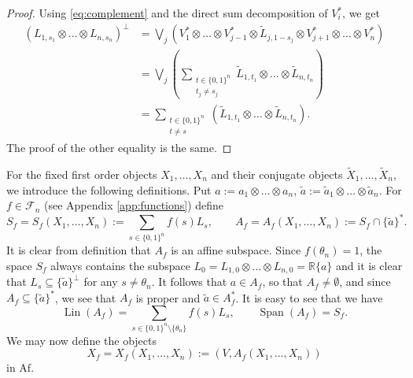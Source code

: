 \documentclass[12pt]{article}
\theoremstyle{definition}
\theoremstyle{remark}
\def\lin{\operatorname{Lin}}
\def\Span{\operatorname{Span}}
\def\Fe{\mathcal F}
\def \Af{\mathrm{Af}}
\begin{document}
\begin{proof} Using \eqref{eq:complement} and the direct sum decomposition of $V_i^*$, we get
\begin{align*}
\left(L_{1,s_{1}}\otimes \dots\otimes L_{n,s_{n}}\right)^\perp&= \bigvee_j\left(
V_{1}^*\otimes
\dots \otimes V_{j-1}^*\otimes \tilde L_{j,1-s_{j}}\otimes V_{j+1}^*\otimes\dots \otimes
V_{n}^*\right)\\
&= \bigvee_j \left( \sum_{\substack{t\in \{0,1\}^n\\ t_{j}\ne s_{j}}} \tilde
L_{1,t_{1}}\otimes\dots \otimes \tilde
L_{n,t_{n}}\right)\\
&= \sum_{\substack{t\in \{0,1\}^n\\ t\ne s}} \left( \tilde L_{1,t_{1}}\otimes\dots \otimes \tilde
L_{n,t_{n}}\right).
\end{align*}
The proof of the other equality is the same.

\end{proof}

For the fixed first order objects  $X_1,\dots,X_n$ and their conjugate objects $\tilde
X_1,\dots,\tilde X_n$, we introduce the following definitions. Put $a:= a_1\otimes\dots \otimes  a_n$, $\tilde a:= \tilde
a_1\otimes\dots\otimes  \tilde a_n$.
For  $f\in \Fe_n$ (see Appendix \ref{app:functions}) define 
\begin{equation}\label{eq:SfAf}
S_f=S_f(X_1,\dots,X_n):=\sum_{s\in \{0,1\}^n} f(s)L_s,\qquad
A_f=A_f(X_1,\dots,X_n):=S_f\cap \{\tilde a\}^*.
\end{equation}
It is clear from definition that $A_f$ is an affine subspace. Since
$f(\theta_n)=1$, the space $S_f$ always contains the subspace $L_0=L_{1,0}\otimes\dots\otimes
L_{n,0}=\mathbb R\{a\}$ and it is clear that $L_s\subseteq \{\tilde a\}^\perp$ for any
$s\ne \theta_n$. It follows that $a\in A_f$, so that $A_f\ne \emptyset$, and since $A_f\subseteq
\{\tilde a\}^*$, we see that  $A_f$ is proper and $\tilde
a\in A^*_f$.  It is easy to see that we have
\[
\lin(A_f)=\sum_{s\in\{0,1\}^n\setminus\{\theta_n\}} f(s)L_s,\qquad \Span(A_f)=S_f.
\]
We may now define the objects
\[
X_f=X_f(X_1,\dots, X_n):=(V,A_f(X_1,\dots,X_n))
\]
in $\Af$.
\end{document}
